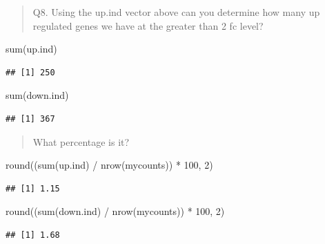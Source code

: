 \documentclass[
]{article}
\newenvironment{Shaded}{\begin{snugshade}}{\end{snugshade}}
\newcommand{\DecValTok}[1]{\textcolor[rgb]{0.00,0.00,0.81}{#1}}
\newcommand{\FunctionTok}[1]{\textcolor[rgb]{0.00,0.00,0.00}{#1}}
\newcommand{\NormalTok}[1]{#1}
\newcommand{\SpecialCharTok}[1]{\textcolor[rgb]{0.00,0.00,0.00}{#1}}
\begin{document}
\begin{quote}
Q8. Using the up.ind vector above can you determine how many up
regulated genes we have at the greater than 2 fc level?
\end{quote}

\begin{Shaded}
\begin{Highlighting}[]
\FunctionTok{sum}\NormalTok{(up.ind)}
\end{Highlighting}
\end{Shaded}

\begin{verbatim}
## [1] 250
\end{verbatim}

\begin{Shaded}
\begin{Highlighting}[]
\FunctionTok{sum}\NormalTok{(down.ind)}
\end{Highlighting}
\end{Shaded}

\begin{verbatim}
## [1] 367
\end{verbatim}

\begin{quote}
What percentage is it?
\end{quote}

\begin{Shaded}
\begin{Highlighting}[]
\FunctionTok{round}\NormalTok{((}\FunctionTok{sum}\NormalTok{(up.ind) }\SpecialCharTok{/} \FunctionTok{nrow}\NormalTok{(mycounts)) }\SpecialCharTok{*} \DecValTok{100}\NormalTok{, }\DecValTok{2}\NormalTok{)}
\end{Highlighting}
\end{Shaded}

\begin{verbatim}
## [1] 1.15
\end{verbatim}

\begin{Shaded}
\begin{Highlighting}[]
\FunctionTok{round}\NormalTok{((}\FunctionTok{sum}\NormalTok{(down.ind) }\SpecialCharTok{/} \FunctionTok{nrow}\NormalTok{(mycounts)) }\SpecialCharTok{*} \DecValTok{100}\NormalTok{, }\DecValTok{2}\NormalTok{)}
\end{Highlighting}
\end{Shaded}

\begin{verbatim}
## [1] 1.68
\end{verbatim}
\end{document}
